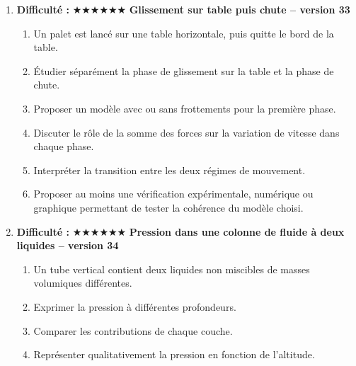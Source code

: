 \documentclass[11pt,a4paper]{article}
\newcommand{\etoiles}[1]{\textbf{Difficulté : }#1}
\begin{document}
\begin{enumerate}[label=\textbf{Problème long \arabic*.},leftmargin=*]
\begin{enumerate}[label=\alph*)]
\item Une cabine d'ascenseur est modélisée par un point matériel de masse totale $m$.
\item On distingue trois phases : démarrage, montée à vitesse constante, freinage.
\item Pour chaque phase, faire le bilan des forces et comparer la tension du câble au poids.
\item Relier qualitativement puis quantitativement la variation de vitesse à la somme des forces.
\item Expliquer pourquoi un passager ressent parfois une sensation de lourdeur ou de légèreté.
\item Proposer au moins une vérification expérimentale, numérique ou graphique permettant de tester la cohérence du modèle choisi.
\end{enumerate}
\item \etoiles{★★★★★★}
\textbf{Glissement sur table puis chute -- version 33}
\begin{enumerate}[label=\alph*)]
\item Un palet est lancé sur une table horizontale, puis quitte le bord de la table.
\item Étudier séparément la phase de glissement sur la table et la phase de chute.
\item Proposer un modèle avec ou sans frottements pour la première phase.
\item Discuter le rôle de la somme des forces sur la variation de vitesse dans chaque phase.
\item Interpréter la transition entre les deux régimes de mouvement.
\item Proposer au moins une vérification expérimentale, numérique ou graphique permettant de tester la cohérence du modèle choisi.
\end{enumerate}
\item \etoiles{★★★★★★}
\textbf{Pression dans une colonne de fluide à deux liquides -- version 34}
\begin{enumerate}[label=\alph*)]
\item Un tube vertical contient deux liquides non miscibles de masses volumiques différentes.
\item Exprimer la pression à différentes profondeurs.
\item Comparer les contributions de chaque couche.
\item Représenter qualitativement la pression en fonction de l'altitude.

\end{enumerate}
\end{enumerate}
\end{document}
